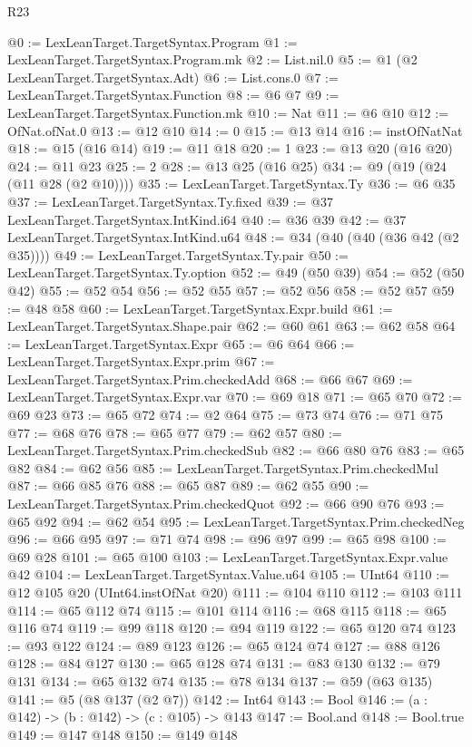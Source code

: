 \begin{lexlean}{R23}
\begin{coremodule}
@0 := LexLeanTarget.TargetSyntax.Program
@1 := LexLeanTarget.TargetSyntax.Program.mk
@2 := List.nil.{0}
@5 := @1 (@2 LexLeanTarget.TargetSyntax.Adt)
@6 := List.cons.{0}
@7 := LexLeanTarget.TargetSyntax.Function
@8 := @6 @7
@9 := LexLeanTarget.TargetSyntax.Function.mk
@10 := Nat
@11 := @6 @10
@12 := OfNat.ofNat.{0}
@13 := @12 @10
@14 := 0
@15 := @13 @14
@16 := instOfNatNat
@18 := @15 (@16 @14)
@19 := @11 @18
@20 := 1
@23 := @13 @20 (@16 @20)
@24 := @11 @23
@25 := 2
@28 := @13 @25 (@16 @25)
@34 := @9 (@19 (@24 (@11 @28 (@2 @10))))
@35 := LexLeanTarget.TargetSyntax.Ty
@36 := @6 @35
@37 := LexLeanTarget.TargetSyntax.Ty.fixed
@39 := @37 LexLeanTarget.TargetSyntax.IntKind.i64
@40 := @36 @39
@42 := @37 LexLeanTarget.TargetSyntax.IntKind.u64
@48 := @34 (@40 (@40 (@36 @42 (@2 @35))))
@49 := LexLeanTarget.TargetSyntax.Ty.pair
@50 := LexLeanTarget.TargetSyntax.Ty.option
@52 := @49 (@50 @39)
@54 := @52 (@50 @42)
@55 := @52 @54
@56 := @52 @55
@57 := @52 @56
@58 := @52 @57
@59 := @48 @58
@60 := LexLeanTarget.TargetSyntax.Expr.build
@61 := LexLeanTarget.TargetSyntax.Shape.pair
@62 := @60 @61
@63 := @62 @58
@64 := LexLeanTarget.TargetSyntax.Expr
@65 := @6 @64
@66 := LexLeanTarget.TargetSyntax.Expr.prim
@67 := LexLeanTarget.TargetSyntax.Prim.checkedAdd
@68 := @66 @67
@69 := LexLeanTarget.TargetSyntax.Expr.var
@70 := @69 @18
@71 := @65 @70
@72 := @69 @23
@73 := @65 @72
@74 := @2 @64
@75 := @73 @74
@76 := @71 @75
@77 := @68 @76
@78 := @65 @77
@79 := @62 @57
@80 := LexLeanTarget.TargetSyntax.Prim.checkedSub
@82 := @66 @80 @76
@83 := @65 @82
@84 := @62 @56
@85 := LexLeanTarget.TargetSyntax.Prim.checkedMul
@87 := @66 @85 @76
@88 := @65 @87
@89 := @62 @55
@90 := LexLeanTarget.TargetSyntax.Prim.checkedQuot
@92 := @66 @90 @76
@93 := @65 @92
@94 := @62 @54
@95 := LexLeanTarget.TargetSyntax.Prim.checkedNeg
@96 := @66 @95
@97 := @71 @74
@98 := @96 @97
@99 := @65 @98
@100 := @69 @28
@101 := @65 @100
@103 := LexLeanTarget.TargetSyntax.Expr.value @42
@104 := LexLeanTarget.TargetSyntax.Value.u64
@105 := UInt64
@110 := @12 @105 @20 (UInt64.instOfNat @20)
@111 := @104 @110
@112 := @103 @111
@114 := @65 @112 @74
@115 := @101 @114
@116 := @68 @115
@118 := @65 @116 @74
@119 := @99 @118
@120 := @94 @119
@122 := @65 @120 @74
@123 := @93 @122
@124 := @89 @123
@126 := @65 @124 @74
@127 := @88 @126
@128 := @84 @127
@130 := @65 @128 @74
@131 := @83 @130
@132 := @79 @131
@134 := @65 @132 @74
@135 := @78 @134
@137 := @59 (@63 @135)
@141 := @5 (@8 @137 (@2 @7))
@142 := Int64
@143 := Bool
@146 := (a : @142) -> (b : @142) -> (c : @105) -> @143
@147 := Bool.and
@148 := Bool.true
@149 := @147 @148
@150 := @149 @148

\end{coremodule}
\end{lexlean}
